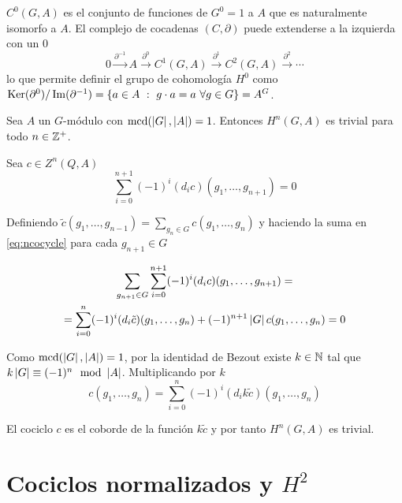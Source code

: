 \begin{observacion}
	$C^0(G,A)$ es el conjunto de funciones de $G^0=1$ a $A$ que es naturalmente isomorfo a $A$. El complejo de cocadenas $(C,\partial)$ puede extenderse a la izquierda con un $0$
	\begin{equation*}
		0 \xrightarrow{\partial^{-1}} A \xrightarrow{\partial^0} C^{1}(G,A) \xrightarrow{\partial^1} C^2(G,A) \xrightarrow{\partial^2} \cdots
	\end{equation*}
	lo que permite definir el grupo de cohomología $H^0$ como $\operatorname{Ker}(\partial^0)/\operatorname{Im}(\partial^{-1}) = \{a\in A \ : \ g\cdot a = a \ \forall g\in G \} = A^G$.
\end{observacion}


\begin{teorema}\label{thm:trivialH}
	Sea $A$ un $G$-módulo con $\operatorname{mcd}(\left|G\right|, \left|A\right|) = 1$. Entonces $H^n(G,A)$ es trivial para todo $n\in\mathbb{Z}^+$.
	\begin{demostracion}
		Sea $c\in Z^n(Q,A)$
		\begin{equation}\label{eq:ncocycle}
			\sum\limits_{i=0}^{n+1} (-1)^i(d_ic)(g_1,\ldots,g_{n+1}) = 0
		\end{equation}
		
		Definiendo $\tilde c(g_1,\hdots,g_{n-1}) = {\displaystyle \sum_{g_n\in G} c(g_1,\hdots,g_{n})}$ y haciendo la suma en \eqref{eq:ncocycle} para cada $g_{n+1} \in G$

		\begin{multline*}
			\sum\limits_{g_{n+1}\in G}\sum\limits_{i=0}^{n+1} (-1)^i(d_ic)(g_1,\ldots,g_{n+1}) = \\ 
			= \sum\limits_{i=0}^{n} (-1)^i(d_i\tilde c)(g_1,\ldots,g_n) + (-1)^{n+1}\left|G\right| c(g_1,\ldots,g_n) = 0
		\end{multline*}
		
		Como $\operatorname{mcd}(\left|G\right|, \left|A\right|) = 1$, por la identidad de Bezout existe $k\in \mathbb{N}$ tal que $k \ord{G} \equiv (-1)^{n} \mod \ord{A}$. Multiplicando por $k$
		\begin{equation*}
			c(g_1,\hdots,g_n) = \sum\limits_{i=0}^n (-1)^i(d_i k\tilde c)(g_1,\ldots,g_n)
		\end{equation*}
		
		El cociclo $c$ es el coborde de la función $k \tilde c$ y por tanto $H^n(G,A)$ es trivial.
	\end{demostracion}
\end{teorema}

\section{Cociclos normalizados y $H^2$}

